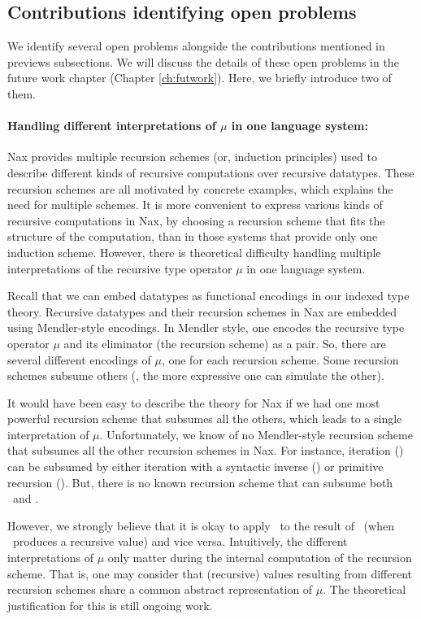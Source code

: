 \subsection{Contributions identifying open problems}
We identify several open problems alongside the contributions mentioned
in previews subsections. We will discuss the details of these open problems
in the future work chapter (Chapter \ref{ch:futwork}).
Here, we briefly introduce two of them.

\paragraph{Handling different interpretations of $\mu$ in one language system:}
Nax provides multiple recursion schemes (or, induction principles) used
to describe different kinds of recursive computations over recursive datatypes.
These recursion schemes are all motivated by concrete examples, which explains
the need for multiple schemes. It is more convenient to express various kinds of
recursive computations in Nax, by choosing a recursion scheme that fits
the structure of the computation, than in those systems that provide
only one induction scheme. However, there is theoretical difficulty
handling multiple interpretations of the recursive type operator $\mu$
in one language system.

Recall that we can embed datatypes as functional encodings in
our indexed type theory. Recursive datatypes and their recursion schemes in Nax
are embedded using Mendler-style encodings.
In Mendler style, one encodes the recursive type operator $\mu$
and its eliminator (the recursion scheme) as a pair.
So, there are several different encodings of $\mu$,
one for each recursion scheme. Some recursion schemes subsume others
(\ie, the more expressive one can simulate the other).

It would have been easy to describe the theory for Nax if we had
one most powerful recursion scheme that subsumes all the others,
which leads to a single interpretation of $\mu$. Unfortunately, we know of
no Mendler-style recursion scheme that subsumes all the other recursion schemes
in Nax. For instance, iteration (\MIt) can be subsumed by either 
iteration with a syntactic inverse (\MsfIt) or primitive recursion (\MPr).
But, there is no known recursion scheme that can subsume both \MsfIt\ and \MPr.

However, we strongly believe that it is okay to apply \MsfIt\ to
the result of \MPr\ (when \MPr\ produces a recursive value) and vice versa.
Intuitively, the different interpretations of $\mu$ only matter during
the internal computation of the recursion scheme. That is, one may consider
that (recursive) values resulting from different recursion schemes
share a common abstract representation of $\mu$.
The theoretical justification for this is still ongoing work.

